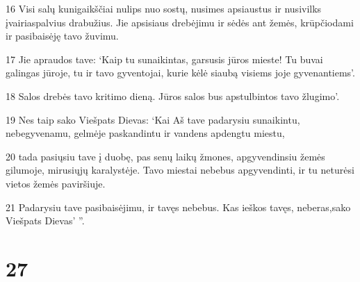 \par 16 Visi salų kunigaikščiai nulips nuo sostų, nusimes apsiaustus ir nusivilks įvairiaspalvius drabužius. Jie apsisiaus drebėjimu ir sėdės ant žemės, krūpčiodami ir pasibaisėję tavo žuvimu. 
\par 17 Jie apraudos tave: ‘Kaip tu sunaikintas, garsusis jūros mieste! Tu buvai galingas jūroje, tu ir tavo gyventojai, kurie kėlė siaubą visiems joje gyvenantiems’. 
\par 18 Salos drebės tavo kritimo dieną. Jūros salos bus apstulbintos tavo žlugimo’. 
\par 19 Nes taip sako Viešpats Dievas: ‘Kai Aš tave padarysiu sunaikintu, nebegyvenamu, gelmėje paskandintu ir vandens apdengtu miestu, 
\par 20 tada pasiųsiu tave į duobę, pas senų laikų žmones, apgyvendinsiu žemės gilumoje, mirusiųjų karalystėje. Tavo miestai nebebus apgyvendinti, ir tu neturėsi vietos žemės paviršiuje. 
\par 21 Padarysiu tave pasibaisėjimu, ir tavęs nebebus. Kas ieškos tavęs, neberas,­sako Viešpats Dievas’ ”.



\chapter{27}


